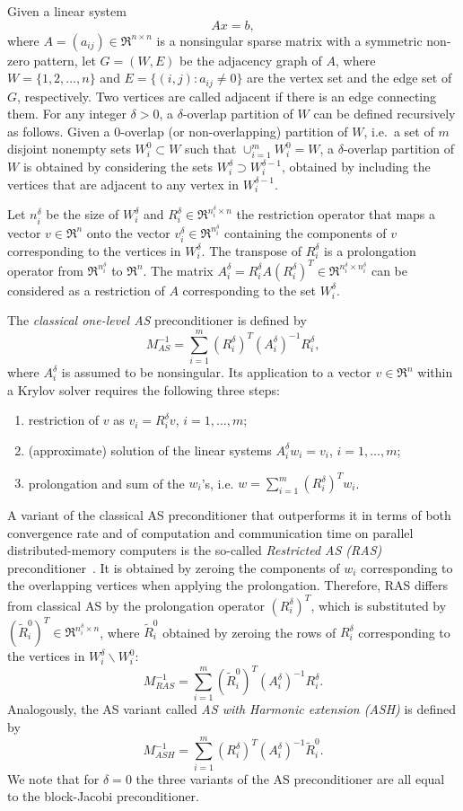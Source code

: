 Given a linear system
\[ Ax=b, \]
where $A=(a_{ij}) \in \Re^{n \times n}$ is a
nonsingular sparse matrix with a symmetric non-zero pattern,
let $G=(W,E)$ be the adjacency graph of $A$, where $W=\{1, 2, \ldots, n\}$
and $E=\{(i,j) : a_{ij} \neq 0\}$ are the vertex set and the edge set of $G$,
respectively. Two vertices are called adjacent if there is an edge connecting
them. For any integer $\delta > 0$, a $\delta$-overlap
partition of $W$ can be defined recursively as follows.
Given a 0-overlap (or non-overlapping) partition of $W$,
i.e.\ a set of $m$ disjoint nonempty sets $W_i^0 \subset W$ such that
$\cup_{i=1}^m W_i^0 = W$, a $\delta$-overlap
partition of $W$ is obtained by considering the sets
$W_i^\delta \supset W_i^{\delta-1}$, obtained by including the vertices that
are adjacent to any vertex in $W_i^{\delta-1}$.

Let $n_i^\delta$ be the size of $W_i^\delta$ and $R_i^{\delta} \in 
\Re^{n_i^\delta \times n}$ the restriction operator that maps
a vector $v \in \Re^n$ onto the vector $v_i^{\delta} \in \Re^{n_i^\delta}$
containing the components of $v$ corresponding to the vertices in
$W_i^\delta$. The transpose of $R_i^{\delta}$ is a
prolongation operator from $\Re^{n_i^\delta}$ to $\Re^n$.
The matrix $A_i^\delta=R_i^\delta A (R_i^\delta)^T \in
\Re^{n_i^\delta \times n_i^\delta}$ can be considered
as a restriction of $A$ corresponding to the set $W_i^{\delta}$.

The \emph{classical one-level AS} preconditioner is defined by
\[
M_{AS}^{-1}= \sum_{i=1}^m (R_i^{\delta})^T 
(A_i^\delta)^{-1} R_i^{\delta},
\]
where $A_i^\delta$ is assumed to be nonsingular. Its application
to a vector $v \in \Re^n$ within a Krylov solver requires the following
three steps:
\begin{enumerate}
	\item restriction of $v$ as $v_i = R_i^{\delta} v$, $i=1,\ldots,m$;
	\item (approximate) solution of the linear systems $A_i^\delta w_i = v_i$,
	      $i=1,\ldots,m$;
	\item prolongation and sum of the $w_i$'s, i.e. $w = \sum_{i=1}^m (R_i^{\delta})^T w_i$.
\end{enumerate}
A variant of the classical AS preconditioner that outperforms it
in terms of both convergence rate and of computation and communication
time on parallel distributed-memory computers is the so-called \emph{Restricted AS
(RAS)} preconditioner~\cite{Cai_Sarkis,Efstathiou_Gander}. It
is obtained by zeroing the components of $w_i$ corresponding to the
overlapping vertices when applying the prolongation. Therefore,
RAS differs from classical AS by the prolongation operator $(R_i^{\delta})^T$,
which is substituted by $(\tilde{R}_i^0)^T \in \Re^{n_i^\delta \times n}$,
where $\tilde{R}_i^0$ obtained by zeroing the rows of $R_i^\delta$
corresponding to the vertices in $W_i^\delta \backslash W_i^0$:
\[
M_{RAS}^{-1}= \sum_{i=1}^m (\tilde{R}_i^0)^T 
(A_i^\delta)^{-1} R_i^{\delta}.
\]
Analogously, the AS variant called \emph{AS with Harmonic extension (ASH)}
is defined by
\[ M_{ASH}^{-1}= \sum_{i=1}^m (R_i^{\delta})^T 
(A_i^\delta)^{-1} \tilde{R}_i^0.
\]
We note that for $\delta=0$ the three variants of the AS preconditioner are
all equal to the block-Jacobi preconditioner.

